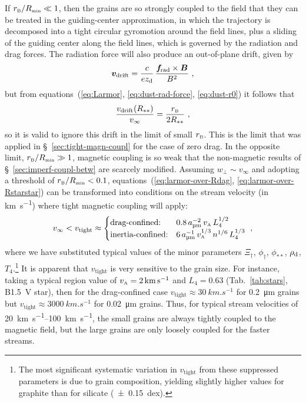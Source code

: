If \(r_{\scriptscriptstyle\text{B}} / R_{\scriptscriptstyle\text{min}} \ll 1\), then the grains are so strongly coupled to the
field that they can be treated in the guiding-center approximation, in
which the trajectory is decomposed into a tight circular gyromotion
around the field lines, plus a sliding of the guiding center along the
field lines, which is governed by the radiation and drag forces.  The
radiation force will also produce an out-of-plane drift, given by
\begin{equation}
  \label{eq:perpendicular-drift}
  \bm{v}_{\text{drift}} = \frac{c}{e z_{\text{d}}} \, \frac{\bm{f}\!_{\text{rad}} \times \bm{B}}{B^2}
  \ ,
\end{equation}
but from equations~(\ref{eq:Larmor}, \ref{eq:dust-rad-force},
\ref{eq:dust-r0}) it follows that
\begin{equation}
  \label{eq:vdrift-over-vinfinity}
  \frac{v_{\text{drift}}(R_{**})}{v_\infty} = \frac{r_{\scriptscriptstyle\text{B}}}{2 R_{**}} \ ,
\end{equation}
so it is valid to ignore this drift in the limit of small \(r_{\scriptscriptstyle\text{B}}\).
This is the limit that was applied in \S~\ref{sec:tight-magn-coupl}
for the case of zero drag.  In the opposite limit,
\(r_{\scriptscriptstyle\text{B}} / R_{\scriptscriptstyle\text{min}} \gg 1\), magnetic coupling is so weak that the
non-magnetic results of \S~\ref{sec:imperf-coupl-betw} are scarcely
modified.  Assuming \(w_\perp \sim v_\infty\) and adopting a threshold of
\(r_{\scriptscriptstyle\text{B}} / R_{\scriptscriptstyle\text{min}} < 0.1\), equations~(\ref{eq:larmor-over-Rdag},
\ref{eq:larmor-over-Rstarstar}) can be transformed into conditions on
the stream velocity (in \si{km.s^{-1}}) where tight magnetic coupling
will apply: \newcommand\freeze{\ensuremath{_{\text{tight}}}}
\begin{equation}
  \label{eq:velocity-strong-B-coupling}
  v_{\infty} < v\freeze \approx
  \begin{cases}
    \text{drag-confined:}
    & 0.8 \, a_{\si{\um}}^{-2} \, v\alfven \, L_4^{1/2}\\
    \text{inertia-confined:}
    & 6 \, a_{\si{\um}}^{-1} \, v\alfven^{1/3} \, n^{1/6} \, L_4^{1/3} \\
  \end{cases} \ ,
\end{equation}
where we have substituted typical values of the minor parameters
\(\Xi_\dag\), \(\phi_{\dag}\), \(\phi_{**}\), \(\rho_{\text{d}}\),
\(T_4\).\footnote{%
  The most significant systematic variation in \(v\freeze\) from these
  suppressed parameters is due to grain composition, yielding slightly
  higher values for graphite than for silicate (\SI{+-0.15}{dex}).} %
It is apparent that \(v\freeze\) is very sensitive to the grain size.
For instance, taking a typical \hii{} region value of
\(v_{\scriptscriptstyle\text{A}} = \SI{2}{km.s^{-1}}\) \citep{Arthur:2011a} and
\(L_4 = 0.63\) (Tab.~\ref{tab:stars}, B1.5~V star), then for the
drag-confined case \(v\freeze \approx \SI{30}{km.s^{-1}}\) for \SI{0.2}{\um}
grains but \(v\freeze \approx \SI{3000}{km.s^{-1}}\) for \SI{0.02}{\um}
grains. Thus, for typical stream velocities of
\SIrange{20}{100}{km.s^{-1}}, the small grains are always tightly
coupled to the magnetic field, but the large grains are only loosely
coupled for the faster streams.

